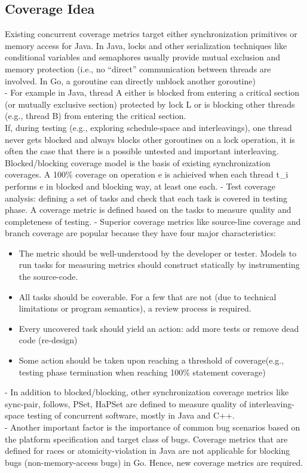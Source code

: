 \subsection{Coverage Idea}
Existing concurrent coverage metrics target either synchronization primitives or memory access for Java. In Java, locks and other serialization techniques like conditional variables and semaphores usually provide mutual exclusion and memory protection (i.e., no “direct” communication between threads are involved. In Go, a goroutine can directly unblock another goroutine)
\\
-	For example in Java,  thread A either is blocked from entering a critical section (or mutually exclusive section) protected by lock L or is blocking other threads (e.g., thread B) from entering the critical section.
\\
If, during testing (e.g., exploring schedule-space and interleavings), one thread never gets blocked and always blocks other goroutines on a lock operation, it is often the case that there is a possible untested and important interleaving. Blocked/blocking coverage model is the basis of existing synchronization coverages. A 100\% coverage on operation e is achieived when each thread t\_i performs e in blocked and blocking way, at least one each.
-	Test coverage analysis: defining a set of tasks and check that each task is covered in testing phase. A coverage metric is defined based on the tasks to measure quality and completeness of testing.
-	Superior coverage metrics like source-line coverage and branch coverage are popular because they have four major characteristics:
\begin{itemize}
  \item The metric should be well-understood by the developer or tester. Models to run tasks for measuring metrics should construct statically by instrumenting the source-code.
  \item All tasks should be coverable. For a few that are not (due to technical limitations or program semantics), a review process is required.
  \item Every uncovered task should yield an action: add more tests or remove dead code (re-design)
  \item Some action should be taken upon reaching a threshold of coverage(e.g., testing phase termination when reaching 100\% statement coverage)
\end{itemize}

-	In addition to blocked/blocking, other synchronization coverage metrics like sync-pair, follows, PSet, HaPSet are defined to measure quality of interleaving-space testing of concurrent software, mostly in Java and C++.
\\
-	Another important factor is the importance of common bug scenarios based on the platform specification and target class of bugs. Coverage metrics that are defined for races or atomicity-violation in Java are not applicable for blocking bugs (non-memory-access bugs) in Go. Hence, new coverage metrics are required.


